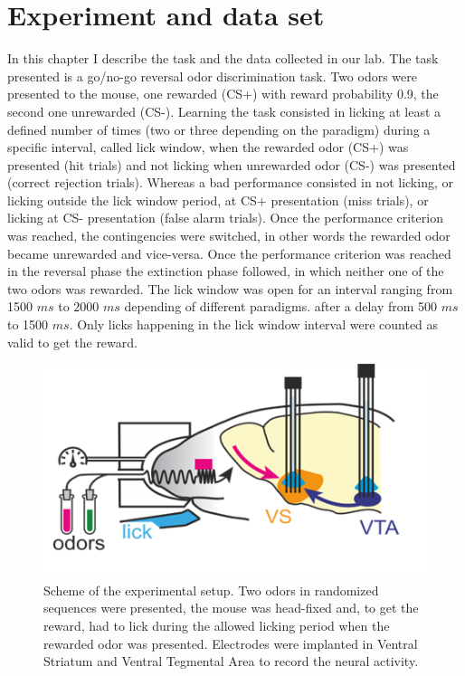 \section{Experiment and data set}
\label{chap:Dataset}
In this chapter I describe the task and the data collected in our lab.
The task presented is a go/no-go reversal odor discrimination task. Two odors were presented to the mouse, one rewarded (CS+) with reward probability 0.9, the second one unrewarded (CS-). Learning the task consisted in licking at least a defined number of times (two or three depending on the paradigm) during a specific interval, called lick window, when the rewarded odor (CS+) was presented (hit trials) and not licking when unrewarded odor (CS-) was presented (correct rejection trials). Whereas a bad performance consisted in not licking, or licking outside the lick window period, at CS+ presentation (miss trials), or licking at CS- presentation (false alarm trials). Once the performance criterion was reached, the contingencies were switched, in other words the rewarded odor became unrewarded and vice-versa. Once the performance criterion was reached in the reversal phase the extinction phase followed, in which neither one of the two odors was rewarded. The lick window was open for an interval ranging from 1500 $ms$ to 2000 $ms$ depending of different paradigms. after a delay from 500 $ms$ to 1500 $ms$. Only licks happening in the lick window interval were counted as valid to get the reward.
\begin{figure}
    \centering
    \includegraphics[scale=1]{figures/Experiment.png}
    \caption{Scheme of the experimental setup. Two odors in randomized sequences were presented, the mouse was head-fixed and, to get the reward, had to lick during the allowed licking period when the rewarded odor was presented. Electrodes were implanted in Ventral Striatum and Ventral Tegmental Area to record the neural activity. }
    \label{fig:experiment}
\end{figure}

